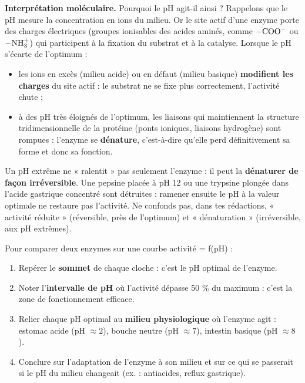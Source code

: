 \documentclass[11pt]{article}
\newcommand{\cle}[1]{{\popxbold\color{popdark}#1}}
\begin{document}
\textbf{Interprétation moléculaire.} Pourquoi le pH agit-il ainsi ? Rappelons que le pH mesure la concentration en ions  du milieu. Or le site actif d'une enzyme porte des \cle{charges électriques} (groupes ionisables des acides aminés, comme $-\ce{COO}^{-}$ ou $-\ce{NH3}^{+}$) qui participent à la fixation du substrat et à la catalyse. Lorsque le pH s'écarte de l'optimum :
\begin{itemize}
\item les ions  en excès (milieu acide) ou en défaut (milieu basique) \textbf{modifient les charges} du site actif : le substrat ne se fixe plus correctement, l'activité chute ;
\item à des pH très éloignés de l'optimum, les liaisons qui maintiennent la structure tridimensionnelle de la protéine (ponts ioniques, liaisons hydrogène) sont rompues : l'enzyme se \textbf{dénature}, c'est-à-dire qu'elle perd définitivement sa forme et donc sa fonction.
\end{itemize}

\begin{attention}[pH extrême = dénaturation, pas simple ralentissement]
Un pH extrême ne « ralentit » pas seulement l'enzyme : il peut la \textbf{dénaturer de façon irréversible}. Une pepsine placée à pH 12 ou une trypsine plongée dans l'acide gastrique concentré sont détruites : ramener ensuite le pH à la valeur optimale ne restaure pas l'activité. Ne confonds pas, dans tes rédactions, « activité réduite » (réversible, près de l'optimum) et « dénaturation » (irréversible, aux pH extrêmes).
\end{attention}

\begin{methode}
Pour comparer deux enzymes sur une courbe activité = f(pH) :
\begin{enumerate}
\item Repérer le \textbf{sommet} de chaque cloche : c'est le pH optimal de l'enzyme.
\item Noter l'\textbf{intervalle de pH} où l'activité dépasse 50 \% du maximum : c'est la zone de fonctionnement efficace.
\item Relier chaque pH optimal au \textbf{milieu physiologique} où l'enzyme agit : estomac acide (pH $\approx 2$), bouche neutre (pH $\approx 7$), intestin basique (pH $\approx 8$).
\item Conclure sur l'adaptation de l'enzyme à son milieu et sur ce qui se passerait si le pH du milieu changeait (ex. : antiacides, reflux gastrique).
\end{enumerate}
\end{methode}
\end{document}
